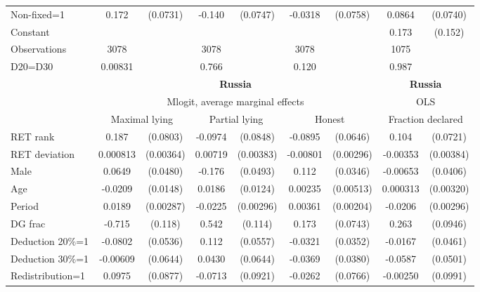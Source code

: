\begin{tabular}{l|cccccc|cc}
Non-fixed=1     &    0.172\sym{**} & (0.0731)&   -0.140\sym{*}  & (0.0747)&  -0.0318         & (0.0758)&   0.0864         & (0.0740)\\
Constant        &                  &         &                  &         &                  &         &    0.173         &  (0.152)\\
\hline
Observations    &     3078         &         &     3078         &         &     3078         &         &     1075         &         \\
D20=D30         &  0.00831         &         &    0.766         &         &    0.120         &         &    0.987         &         \\
\hline\hline
&\multicolumn{6}{c|}{\bf Russia}&\multicolumn{2}{c}{\bf Russia}\\ &\multicolumn{6}{c|}{Mlogit, average marginal effects }&\multicolumn{2}{c}{OLS}\\
                &\multicolumn{2}{c}{Maximal lying}&\multicolumn{2}{c}{Partial lying}&\multicolumn{2}{c}{Honest}  &\multicolumn{2}{c}{Fraction declared}\\
\hline
RET rank        &    0.187\sym{**} & (0.0803)&  -0.0974         & (0.0848)&  -0.0895         & (0.0646)&    0.104         & (0.0721)\\
RET deviation   & 0.000813         &(0.00364)&  0.00719\sym{*}  &(0.00383)& -0.00801\sym{***}&(0.00296)& -0.00353         &(0.00384)\\
Male            &   0.0649         & (0.0480)&   -0.176\sym{***}& (0.0493)&    0.112\sym{***}& (0.0346)& -0.00653         & (0.0406)\\
Age             &  -0.0209         & (0.0148)&   0.0186         & (0.0124)&  0.00235         &(0.00513)& 0.000313         &(0.00320)\\
Period          &   0.0189\sym{***}&(0.00287)&  -0.0225\sym{***}&(0.00296)&  0.00361\sym{*}  &(0.00204)&  -0.0206\sym{***}&(0.00296)\\
DG frac         &   -0.715\sym{***}&  (0.118)&    0.542\sym{***}&  (0.114)&    0.173\sym{**} & (0.0743)&    0.263\sym{***}& (0.0946)\\
Deduction 20\%=1&  -0.0802         & (0.0536)&    0.112\sym{**} & (0.0557)&  -0.0321         & (0.0352)&  -0.0167         & (0.0461)\\
Deduction 30\%=1& -0.00609         & (0.0644)&   0.0430         & (0.0644)&  -0.0369         & (0.0380)&  -0.0587         & (0.0501)\\
Redistribution=1&   0.0975         & (0.0877)&  -0.0713         & (0.0921)&  -0.0262         & (0.0766)& -0.00250         & (0.0991)\\

\end{tabular}
